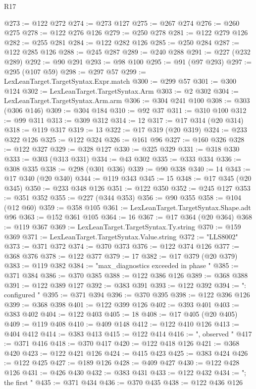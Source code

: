 \begin{lexlean}{R17}
\begin{coremodule}
{{{{{{{{{{{{{{{{{{{{{{{{{{{{{{{{{{{{{{{{{{{{{{{{{{{{{{{{{{{{{{{{{{{{{{{{{{{{{{{{{{{{{{{{{{{{{{{{{{{{{{{{{{{@273 := @122 @272
@274 := @273 @127
@275 := @267 @274
@276 := @260 @275
@278 := @122 @276 @126
@279 := @250 @278
@281 := @122 @279 @126
@282 := @255 @281
@284 := @122 @282 @126
@285 := @250 @284
@287 := @122 @285 @126
@288 := @245 @287
@289 := @240 @288
@291 := @227 (@232 @289)
@292 := @90 @291
@293 := @98 @100
@295 := @91 (@97 @293)
@297 := @295 (@107 @59)
@298 := @297 @57
@299 := LexLeanTarget.TargetSyntax.Expr.match
@300 := @299 @57
@301 := @300 @124
@302 := LexLeanTarget.TargetSyntax.Arm
@303 := @2 @302
@304 := LexLeanTarget.TargetSyntax.Arm.arm
@306 := @304 @241 @100
@308 := @303 (@306 @146)
@309 := @304 @184
@310 := @92 @37
@311 := @310 @100
@312 := @99 @311
@313 := @309 @312
@314 := 12
@317 := @17 @314 (@20 @314)
@318 := @119 @317
@319 := 13
@322 := @17 @319 (@20 @319)
@324 := @233 @322 @126
@325 := @122 @324
@326 := @161 @96
@327 := @160 @326
@328 := @122 @327
@329 := @328 @127
@330 := @325 @329
@331 := @318 @330
@333 := @303 (@313 @331)
@334 := @43 @302
@335 := @333 @334
@336 := @308 @335
@338 := @298 (@301 @336)
@339 := @90 @338
@340 := 14
@343 := @17 @340 (@20 @340)
@344 := @119 @343
@345 := 15
@348 := @17 @345 (@20 @345)
@350 := @233 @348 @126
@351 := @122 @350
@352 := @245 @127
@353 := @351 @352
@355 := @227 (@344 @353)
@356 := @90 @355
@358 := @104 (@12 @60)
@359 := @358 @105
@361 := LexLeanTarget.TargetSyntax.Shape.adt @96
@363 := @152 @361 @105
@364 := 16
@367 := @17 @364 (@20 @364)
@368 := @119 @367
@369 := LexLeanTarget.TargetSyntax.Ty.string
@370 := @159 @369
@371 := LexLeanTarget.TargetSyntax.Value.string
@372 := "LLS8002"
@373 := @371 @372
@374 := @370 @373
@376 := @122 @374 @126
@377 := @368 @376
@378 := @122 @377
@379 := 17
@382 := @17 @379 (@20 @379)
@383 := @119 @382
@384 := "max_diagnostics exceeded in phase "
@385 := @371 @384
@386 := @370 @385
@388 := @122 @386 @126
@389 := @368 @388
@391 := @122 @389 @127
@392 := @383 @391
@393 := @122 @392
@394 := ": configured "
@395 := @371 @394
@396 := @370 @395
@398 := @122 @396 @126
@399 := @368 @398
@401 := @122 @399 @126
@402 := @393 @401
@403 := @383 @402
@404 := @122 @403
@405 := 18
@408 := @17 @405 (@20 @405)
@409 := @119 @408
@410 := @409 @148
@412 := @122 @410 @126
@413 := @404 @412
@414 := @383 @413
@415 := @122 @414
@416 := ", observed "
@417 := @371 @416
@418 := @370 @417
@420 := @122 @418 @126
@421 := @368 @420
@423 := @122 @421 @126
@424 := @415 @423
@425 := @383 @424
@426 := @122 @425
@427 := @189 @126
@428 := @409 @427
@430 := @122 @428 @126
@431 := @426 @430
@432 := @383 @431
@433 := @122 @432
@434 := "; the first "
@435 := @371 @434
@436 := @370 @435
@438 := @122 @436 @126
}}}}}}}}}}}}}}}}}}}}}}}}}}}}}}}}}}}}}}}}}}}}}}}}}}}}}}}}}}}}}}}}}}}}}}}}}}}}}}}}}}}}}}}}}}}}}}}}}}}}}}}}}}}
\end{coremodule}
\end{lexlean}
